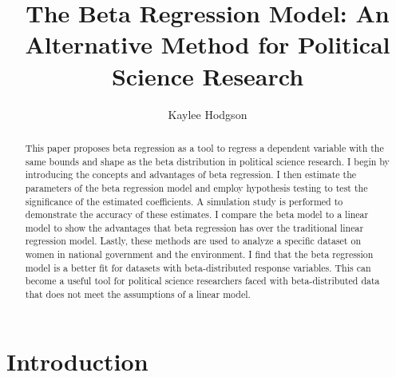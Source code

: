 \documentclass{svproc}
\begin{document}
\mainmatter              %
%
\title{The Beta Regression Model: An Alternative Method for Political Science Research}
%
%
\author{Kaylee Hodgson}
%
%

\maketitle              %

\begin{abstract}
This paper proposes beta regression as a tool to regress a dependent variable with the same bounds and shape as the beta distribution in political science research. I begin by introducing the concepts and advantages of beta regression. I then estimate the parameters of the beta regression model and employ hypothesis testing to test the significance of the estimated coefficients. A simulation study is performed to demonstrate the accuracy of these estimates. I compare the beta model to a linear model to show the advantages that beta regression has over the traditional linear regression model. Lastly, these methods are used to analyze a specific dataset on women in national government and the environment. I find that the beta regression model is a better fit for datasets with beta-distributed response variables. This can become a useful tool for political science researchers faced with beta-distributed data that does not meet the assumptions of a linear model.

\end{abstract}
%
\section{Introduction}
\end{document}
